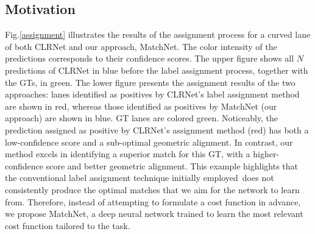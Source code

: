 \documentclass[10pt,twocolumn,letterpaper]{article}
\begin{document}
\subsection{Motivation}
Fig.\ref{assignment} illustrates the results of the assignment process for a curved lane of both CLRNet and our approach, MatchNet. The color intensity of the predictions corresponds to their confidence scores. The upper figure shows all $N$ predictions of CLRNet in blue before the label assignment process, together with the GTs, in green. The lower figure presents the assignment results of the two approaches: lanes identified as positives by CLRNet's label assignment method are shown in red, whereas those identified as positives by MatchNet (our approach) are shown in blue. GT lanes are colored green. Noticeably, the prediction assigned as positive by CLRNet's assignment method (red) has both a low-confidence score and a sub-optimal geometric alignment. In contrast, our method excels in identifying a superior match for this GT, with a higher-confidence score and better geometric alignment. This example highlights that the conventional label assignment technique initially employed does not consistently produce the optimal matches that we aim for the network to learn from. Therefore, instead of attempting to formulate a cost function in advance, we propose MatchNet, a deep neural network trained to learn the most relevant cost function tailored to the task.
\end{document}

